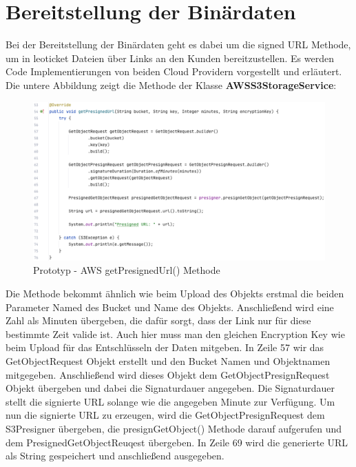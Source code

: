 \newpage

\section{Bereitstellung der Binärdaten}

Bei der Bereitstellung der Binärdaten geht es dabei um die signed URL Methode, um in leoticket Dateien über Links an den Kunden bereitzustellen. Es werden Code Implementierungen von beiden Cloud Providern vorgestellt und erläutert.\\

Die untere Abbildung zeigt die Methode der Klasse \textbf{AWSS3StorageService}:

\begin{figure}[h]
	\centering
	\includegraphics[width=13cm,keepaspectratio]{Pictures/AWSgetSignedUrl.png}
	\caption{Prototyp - AWS getPresignedUrl() Methode}
\end{figure}

Die Methode bekommt ähnlich wie beim Upload des Objekts erstmal die beiden Parameter Named des Bucket und Name des Objekts. Anschließend wird eine Zahl als Minuten übergeben, die dafür sorgt, dass der Link nur für diese bestimmte Zeit valide ist. Auch hier muss man den gleichen Encryption Key wie beim Upload für das Entschlüsseln der Daten mitgeben. In Zeile 57 wir das GetObjectRequest Objekt erstellt und den Bucket Namen und Objektnamen mitgegeben. Anschließend wird dieses Objekt dem GetObjectPresignRequest Objekt übergeben und dabei die Signaturdauer angegeben. Die Signaturdauer stellt die signierte URL solange wie die angegeben Minute zur Verfügung. Um nun die signierte URL zu erzeugen, wird die GetObjectPresignRequest dem S3Presigner übergeben, die presignGetObject() Methode darauf aufgerufen und dem PresignedGetObjectReuqest übergeben. In Zeile 69 wird die generierte URL als String gespeichert und anschließend ausgegeben.

